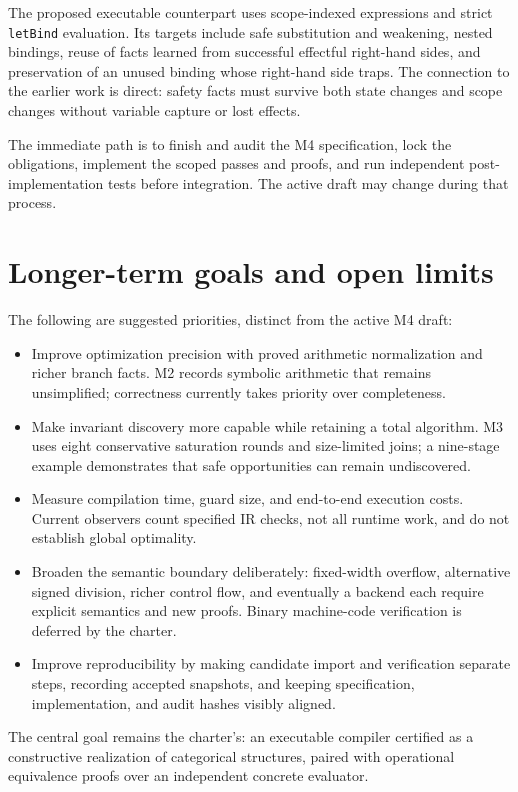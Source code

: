 \documentclass[11pt]{article}
\begin{document}
The proposed executable counterpart uses scope-indexed expressions and strict \texttt{letBind} evaluation. Its targets include safe substitution and weakening, nested bindings, reuse of facts learned from successful effectful right-hand sides, and preservation of an unused binding whose right-hand side traps. The connection to the earlier work is direct: safety facts must survive both state changes and scope changes without variable capture or lost effects.

The immediate path is to finish and audit the M4 specification, lock the obligations, implement the scoped passes and proofs, and run independent post-implementation tests before integration. The active draft may change during that process.

\section*{Longer-term goals and open limits}

The following are suggested priorities, distinct from the active M4 draft:

\begin{itemize}
\item Improve optimization precision with proved arithmetic normalization and richer branch facts. M2 records symbolic arithmetic that remains unsimplified; correctness currently takes priority over completeness.
\item Make invariant discovery more capable while retaining a total algorithm. M3 uses eight conservative saturation rounds and size-limited joins; a nine-stage example demonstrates that safe opportunities can remain undiscovered.
\item Measure compilation time, guard size, and end-to-end execution costs. Current observers count specified IR checks, not all runtime work, and do not establish global optimality.
\item Broaden the semantic boundary deliberately: fixed-width overflow, alternative signed division, richer control flow, and eventually a backend each require explicit semantics and new proofs. Binary machine-code verification is deferred by the charter.
\item Improve reproducibility by making candidate import and verification separate steps, recording accepted snapshots, and keeping specification, implementation, and audit hashes visibly aligned.
\end{itemize}

The central goal remains the charter's: an executable compiler certified as a constructive realization of categorical structures, paired with operational equivalence proofs over an independent concrete evaluator.
\end{document}

